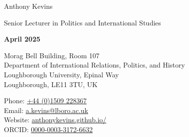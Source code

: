 \documentclass[letterpaper,fontsize=10.5pt]{scrartcl}
\begin{document}


\huge Anthony Kevins\\
\begin{minipage}[t]{.75\linewidth}
	\large Senior Lecturer in Politics and International Studies\\ 
\end{minipage}%
\begin{minipage}[t]{.25\linewidth}
	\raggedleft
	\scriptsize \textbf{April 2025}\\
\end{minipage}%
\normalsize

\hrulefill

\begin{minipage}[p]{.6\linewidth}
	\raggedright
	\medskip
	Morag Bell Building, Room 107\\
	Department of International Relations, Politics, and History\\
	Loughborough University, Epinal Way\\
	Loughborough, LE11 3TU, UK\\
	\medskip
\end{minipage}%
\begin{minipage}[p]{.4\linewidth}
	\raggedleft
	\medskip
	Phone: \href{tel:+4401509228367}{+44 (0)1509 228367}\\
	Email: \href{mailto:a.kevins@lboro.ac.uk}{a.kevins@lboro.ac.uk}\\
	Website: \href{https://anthonykevins.github.io/}{anthonykevins.github.io/}\\
	ORCID: \href{https://orcid.org/0000-0003-3172-6632}{0000-0003-3172-6632}\\
	\medskip%
\end{minipage}

\hrulefill

\end{document}
